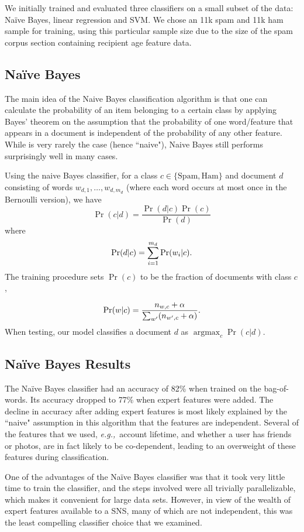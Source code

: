 \documentclass[preprint]{acm_proc_article-sp}
\DeclareMathOperator{\Argmax}{argmax}
\newcommand{\PosC}{\mathrm{Spam}}
\newcommand{\NegC}{\mathrm{Ham}}
\newcommand{\eg}{{\em e.g.,}~}
\begin{document}
We initially trained and evaluated three classifiers on a small subset of the data: 
Na\"ive Bayes, linear regression and SVM.  We chose an 11k spam and 11k ham sample for 
training, using this particular sample size due to the size of the spam corpus 
section containing recipient age feature data.  

\subsection{Na\"ive Bayes}

The main idea of the Naive Bayes classification algorithm is that one can calculate the probability 
of an item belonging to a certain class by applying Bayes' theorem on the assumption that the probability 
of one word/feature that appears in a document is independent of the probability of any other feature. 
While is very rarely the case (hence ``naive"), Naive Bayes still performs surprisingly well in many cases.
 
Using the naive Bayes classifier, for a class \(c \in \{\PosC, \NegC\}\) and document \(d\) consisting of words \(w_{d,1},\dotsc,w_{d,m_d}\) (where each word occurs at most once in the Bernoulli version), we have
\[\Pr(c|d)=\frac{\Pr(d|c)\Pr(c)}{\Pr(d)}\]
where
\[\Pr(d|c)=\sum_{i=1}^{m_d}\Pr(w_i|c)\ldotp\]
The training procedure sets \(\Pr(c)\) to be the fraction of documents with class \(c\),%

\[\Pr(w|c)=\frac{n_{w,c}+\alpha}{\sum_{w'}(n_{w',c}+\alpha)}\ldotp\]
When testing, our model classifies a document \(d\) as \(\Argmax_c\Pr(c|d)\).

\subsection{Na\"ive Bayes Results}

The Na\"ive Bayes classifier had an accuracy of 82\% when trained on the bag-of-words. Its accuracy dropped 
to 77\% when expert features were added. The decline in accuracy after adding expert features is most likely 
explained by the ``naive" assumption in this algorithm that the features are independent. Several of 
the features that we used, \eg{account lifetime, and whether a user has friends or photos}, are in 
fact likely to be co-dependent, leading to an overweight of these features during classification. 

One of the advantages of the Na\"ive Bayes classifier was that it took very little time to train the classifier, 
and the steps involved were all trivially parallelizable, which makes it convenient for large data sets. 
However, in view of the wealth of expert features available to a SNS, many of which are not independent, this was 
the least compelling classifier choice that we examined.
\end{document}

